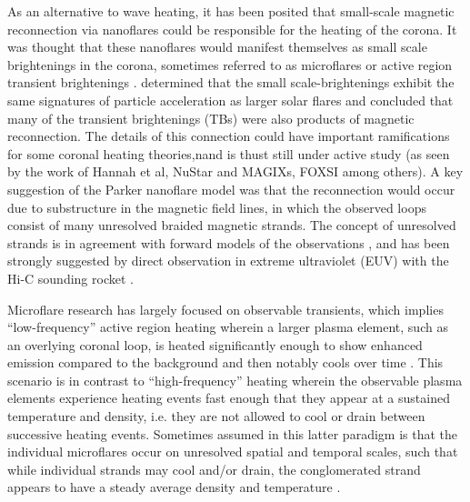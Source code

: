 \documentclass[twocolumn]{aastex62}
\begin{document}
As an alternative to wave heating, it has been posited that small-scale magnetic reconnection via nanoflares \citep[][]{1983Parker} could be responsible for the heating of the corona. 
It was thought that these nanoflares would manifest themselves as small scale brightenings in the corona, sometimes referred to as microflares or active region transient brightenings \citep[][]{1984LinEA_microflares, 1991Hudson, 1992ShimizuEA, 1995Shimizu}. 
\citet{1997GaryEA} determined that the small scale-brightenings exhibit the same signatures of particle acceleration as larger solar flares and concluded that many of the transient brightenings (TBs) were also products of magnetic reconnection. 
The details of this connection could have important ramifications for some coronal heating theories,nand is thust still under active study (as seen by the work of Hannah et al, NuStar and MAGIXs, FOXSI among others).
A key suggestion of the Parker nanoflare model was that the reconnection would occur due to substructure in the magnetic field lines, in which the observed loops consist of many unresolved braided magnetic strands. 
The concept of unresolved strands is in agreement with forward models of the observations \citep[e.g.][]{2012BrooksEA, 2014KobelskiEA_XRTTBs, 2014KobelskiMcKenzie_HiC}, and has been strongly suggested by direct observation in extreme ultraviolet (EUV) with the Hi-C sounding rocket \citep[][]{2013CirtainEA_HiC}. 

Microflare research has largely focused on observable transients, which implies ``low-frequency'' active region heating wherein a larger plasma element, such as an overlying coronal loop, is heated significantly enough to show enhanced emission compared to the background and then notably cools over time \citep[][]{2015Klimchuk_CHoverview}. 
This scenario is in contrast to ``high-frequency'' heating wherein the observable plasma elements experience heating events fast enough that they appear at a sustained temperature and density, i.e. they are not allowed to cool or drain between successive heating events. 
Sometimes assumed in this latter paradigm is that the individual microflares occur on unresolved spatial and temporal scales, such that while individual strands may cool and/or drain, the conglomerated strand appears to have a steady average density and temperature \citep[e.g.][]{2013BrooksEA_LoopSize, 2014SubramanianEA_LowAndHighFrequency, 2016SchmelzEA}. 
\end{document}
